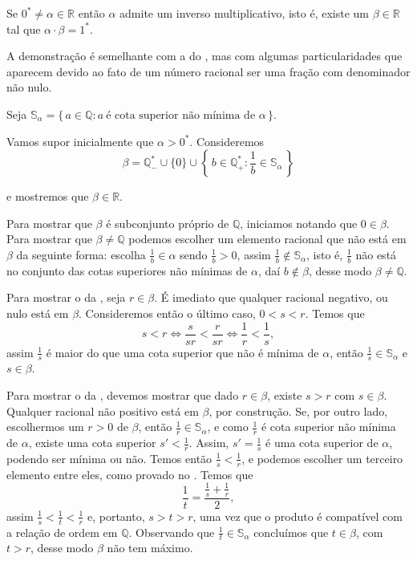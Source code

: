 \documentclass[../main.tex]{subfiles}
\begin{document}
\begin{teo}\label{reais-teo-simetricoProduto}
    Se $0^* \neq \alpha \in \mathbb{R}$ então $\alpha$ admite um inverso multiplicativo, isto é, existe um $\beta \in \mathbb{R}$ tal que $\alpha \cdot \beta = 1^*$.
\end{teo}
\begin{dem}
    A demonstração é semelhante com a do , mas com algumas particularidades que aparecem devido ao fato de um número racional ser uma fração com denominador não nulo.

    Seja $\mathbb{S}_{\alpha} = \{\, a \in \mathbb{Q} : a\ \text{é cota superior não mínima de }\alpha \,\}$.

    Vamos supor inicialmente que $\alpha > 0^*$. Consideremos 
    \[ \beta = \mathbb{Q}_{-}^* \cup \{ 0 \} \cup 
    \left\{\, b \in \mathbb{Q}_{+}^* : \frac{1}{b} \in \mathbb{S}_{\alpha} \,\right\} \] 

    \noindent e mostremos que $\beta \in \mathbb{R}$.
    
    Para mostrar que $\beta$ é subconjunto próprio de $\mathbb{Q}$, iniciamos notando que $0 \in \beta$. Para mostrar que $\beta \neq \mathbb{Q}$ podemos escolher um elemento racional que não está em $\beta$ da seguinte forma: escolha $\frac{1}{b} \in \alpha$ sendo $\frac{1}{b} > 0$, assim $\frac{1}{b} \not\in \mathbb{S}_{\alpha}$, isto é, $\frac{1}{b}$ não está no conjunto das cotas superiores não mínimas de $\alpha$, daí $b \not\in \beta$, desse modo $\beta \neq \mathbb{Q}$.
    
    Para mostrar o  da , seja $r \in \beta$. É imediato que qualquer racional negativo, ou nulo está em $\beta$. Consideremos então o último caso, $0 < s < r$. Temos que 
    \[ s < r \iff \frac{s}{sr} < \frac{r}{sr} \iff \frac{1}{r} < \frac{1}{s}, \] 
    assim $\frac{1}{s}$ é maior do que uma cota superior que não é mínima de $\alpha$, então $\frac{1}{s} \in \mathbb{S}_{\alpha}$ e $s \in \beta$.

    Para mostrar o  da , devemos mostrar que dado $r \in \beta$, existe $s>r$ com $s \in \beta$. Qualquer racional não positivo está em $\beta$, por construção. Se, por outro lado, escolhermos um $r > 0$ de $\beta$, então $\frac{1}{r} \in \mathbb{S}_{\alpha}$, e como $\frac{1}{r}$ é cota superior não mínima de $\alpha$, existe uma cota superior $s' < \frac{1}{r}$. Assim, $s' = \frac{1}{s}$ é uma cota superior de $\alpha$, podendo ser mínima ou não. Temos então $\frac{1}{s} < \frac{1}{r}$, e podemos escolher um terceiro elemento entre eles, como provado no . Temos que
    \[ \dfrac{1}{t} = \dfrac{\frac{1}{s} + \frac{1}{r}}{2}, \]
    assim $\frac{1}{s} < \frac{1}{t} < \frac{1}{r}$ e, portanto, $s > t > r$, uma vez que o produto é compatível com a relação de ordem em $\mathbb{Q}$. Observando que $\frac{1}{t} \in \mathbb{S}_{\alpha}$ concluímos que $t \in \beta$, com $t>r$, desse modo $\beta$ não tem máximo. 


\end{dem}
\end{document}
